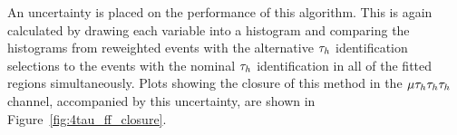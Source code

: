 An uncertainty is placed on the performance of this algorithm.
This is again calculated by drawing each variable into a histogram and comparing the histograms from reweighted events with the alternative $\tau_{h}$ identification selections to the events with the nominal $\tau_{h}$ identification in all of the fitted regions simultaneously.
Plots showing the closure of this method in the $\mu\tau_{h}\tau_{h}\tau_{h}$ channel, accompanied by this uncertainty, are shown in Figure~\ref{fig:4tau_ff_closure}. \\

\begin{figure}[!hbtp]
\centering
     \\

\end{figure}
